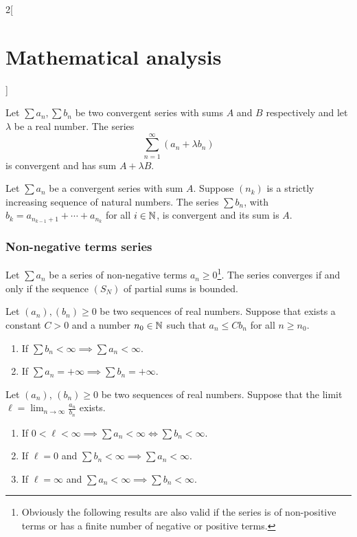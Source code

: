 \documentclass[../../../main.tex]{subfiles}
\begin{document}
\begin{multicols}{2}[\section{Mathematical analysis}]
\begin{corollary}
\end{corollary}
\begin{theorem}[Linearity]
Let $\sum a_n,\sum b_n$ be two convergent series with sums $A$ and $B$ respectively and let $\lambda$ be a real number. The series $$\sum_{n=1}^\infty (a_n+\lambda b_n)$$ is convergent and has sum $A+\lambda B$.
\end{theorem}
\begin{theorem}
Let $\sum a_n$ be a convergent series with sum $A$. Suppose $(n_k)$ is a strictly increasing sequence of natural numbers. The series $\sum b_n$, with $b_k=a_{n_{k-1}+1}+\cdots+a_{n_k}$ for all $i\in\mathbb{N} $, is convergent and its sum is $A$.
\end{theorem}
\subsubsection*{Non-negative terms series}
\begin{theorem}
Let $\sum a_n$ be a series of non-negative terms $a_n\geq 0$\footnote{Obviously the following results are also valid if the series is of non-positive terms or has a finite number of negative or positive terms.}. The series converges if and only if the sequence $(S_N)$ of partial sums is bounded.
\end{theorem}
\begin{theorem}
Let $(a_n),(b_n)\geq 0$ be two sequences of real numbers. Suppose that exists a constant $C>0$ and a number $n_0\in\mathbb{N} $ such that $a_n\leq Cb_n$ for all $n\geq n_0$.
\begin{enumerate}
    \item If $\sum b_n<\infty\implies\sum a_n<\infty$.
    \item If $\sum a_n=+\infty\implies\sum b_n=+\infty$.
\end{enumerate}
\end{theorem}
\begin{theorem}
Let $(a_n)$, $(b_n)\geq 0$ be two sequences of real numbers. Suppose that the limit $\ell=\displaystyle\lim_{n\to\infty}\frac{a_n}{b_n}$ exists.
\begin{enumerate}
    \item If $0<\ell<\infty\implies\sum a_n<\infty\iff\sum b_n<\infty$.
    \item If $\ell=0$ and $\sum b_n<\infty\implies\sum a_n<\infty$.
    \item If $\ell=\infty$ and $\sum a_n<\infty\implies\sum b_n<\infty$.
\end{enumerate}

\end{theorem}
\end{multicols}
\end{document}
